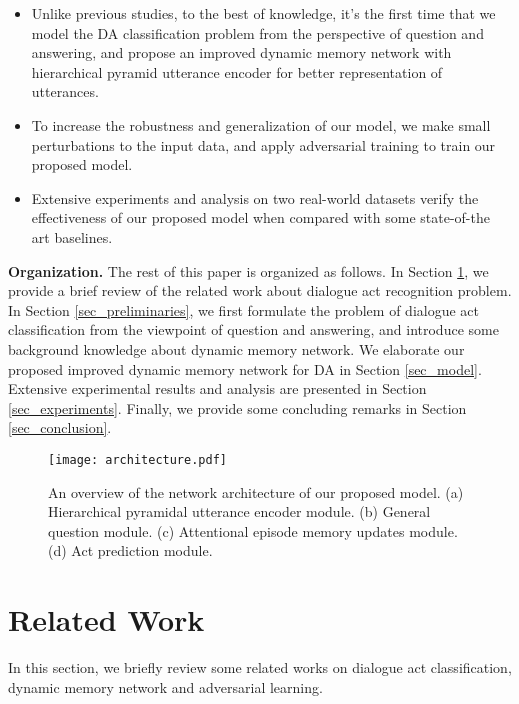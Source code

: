 \documentclass[conference]{IEEEtran}
\begin{document}
	\begin{itemize}
		\item Unlike previous studies, to the best of knowledge, it's the first time that we model the DA classification problem from the perspective of question and answering, and propose an improved dynamic memory network with hierarchical pyramid utterance encoder for better representation of utterances. 
		\item To increase the robustness and generalization of our model, we make small perturbations to the input data, and apply adversarial training to train our proposed model.
		\item Extensive experiments and analysis on two real-world datasets verify the effectiveness of our proposed model when compared with some state-of-the art baselines. \end{itemize}
	
	\noindent\textbf{Organization.} The rest of this paper is organized as follows. In Section \ref{sec_relatedwork}, we provide a brief review of the related work about dialogue act recognition problem. In Section \ref{sec_preliminaries}, we first formulate the problem of dialogue act classification from the viewpoint of question and answering, and introduce some background knowledge about dynamic memory network.
	We elaborate our proposed improved dynamic memory network for DA in Section \ref{sec_model}.
	Extensive experimental results and analysis are presented in Section \ref{sec_experiments}. Finally, we provide some concluding remarks in Section \ref{sec_conclusion}.
	
	\begin{figure*}[!t]
		\centering
		\texttt{[image: architecture.pdf]}\\
		\caption{An overview of the network architecture of our proposed model. (a) Hierarchical pyramidal utterance encoder module. (b) General question module. (c) Attentional episode memory updates module. (d) Act prediction module.}
		\label{fig:architecture}
	\end{figure*}
	\section{Related Work}\label{sec_relatedwork}
	In this section, we briefly review some related works on dialogue act classification, dynamic memory network and adversarial learning.
	
\end{document}
